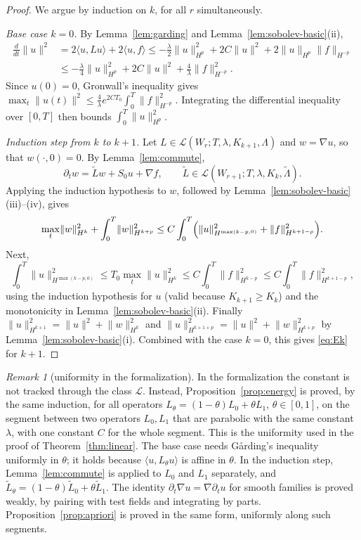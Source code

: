 \documentclass[11pt,reqno]{amsart}
\theoremstyle{definition}
\theoremstyle{remark}
\newtheorem{remark}[theorem]{Remark}
\newcommand{\Lcl}{\mathcal{L}}
\newcommand{\ip}[2]{\langle #1,#2\rangle}
\newcommand{\norm}[1]{\lVert #1\rVert}
\newcommand{\uses}[1]{}
\numberwithin{equation}{section}
\begin{document}
\begin{proof}
\uses{lem:garding, lem:commute, lem:sobolev-basic, fact:gronwall}
We argue by induction on $k$, for all $r$ simultaneously.

\emph{Base case $k=0$.} By Lemma~\ref{lem:garding} and
Lemma~\ref{lem:sobolev-basic}(ii),
\begin{align*}
\frac{d}{dt}\norm u^2&=2\ip u{Lu}+2\ip uf
\le-\frac\lambda2\norm u_{H^p}^2+2C\norm u^2+2\norm u_{H^p}\norm f_{H^{-p}}\\
&\le-\frac\lambda4\norm u_{H^p}^2+2C\norm u^2+\frac4\lambda\norm f_{H^{-p}}^2 .
\end{align*}
Since $u(0)=0$, Gronwall's inequality gives
$\max_t\norm{u(t)}^2\le\frac4\lambda e^{2CT_0}\int_0^T\norm f_{H^{-p}}^2$. Integrating the differential
inequality over $[0,T]$ then bounds $\int_0^T\norm u_{H^p}^2$.

\emph{Induction step from $k$ to $k+1$.} Let $L\in\Lcl(W_r;T,\lambda,K_{k+1},\Lambda)$ and $w=\nabla u$,
so that $w(\cdot,0)=0$. By Lemma~\ref{lem:commute},
\[
  \partial_tw=\tilde Lw+S_0u+\nabla f,\qquad\tilde L\in\Lcl(W_{r+1};T,\lambda,K_k,\tilde\Lambda).
\]
Applying the induction hypothesis to $w$, followed by Lemma~\ref{lem:sobolev-basic}(iii)--(iv), gives
\[
  \max_t\norm{w}_{H^k}^2+\int_0^T\norm w_{H^{k+p}}^2
  \le C\int_0^T\Bigl(\norm u^2_{H^{\max(k-p,0)}}+\norm f_{H^{k+1-p}}^2\Bigr).
\]
Next,
\[
  \int_0^T\norm u^2_{H^{\max(k-p,0)}}\le T_0\max_t\norm u_{H^k}^2
  \le C\int_0^T\norm f_{H^{k-p}}^2\le C\int_0^T\norm f^2_{H^{k+1-p}},
\]
using the induction hypothesis for $u$ (valid because $K_{k+1}\ge K_k$) and the monotonicity in
Lemma~\ref{lem:sobolev-basic}(ii). Finally
$\norm u_{H^{k+1}}^2=\norm u^2+\norm w_{H^k}^2$ and
$\norm u_{H^{k+1+p}}^2=\norm u^2+\norm w_{H^{k+p}}^2$ by Lemma~\ref{lem:sobolev-basic}(i). Combined
with the case $k=0$, this gives \eqref{eq:Ek} for $k+1$.
\end{proof}

\begin{remark}[uniformity in the formalization]
In the formalization the constant is not tracked through the class $\Lcl$. Instead,
Proposition~\ref{prop:energy} is proved, by the same induction, for all operators
$L_\theta=(1-\theta)L_0+\theta L_1$, $\theta\in[0,1]$, on the segment between two operators $L_0,L_1$ that
are parabolic with the same constant $\lambda$, with one constant $C$ for the whole segment. This is
the uniformity used in the proof of Theorem~\ref{thm:linear}. The base case needs G\aa rding's inequality
uniformly in $\theta$; it holds because $\ip u{L_\theta u}$ is affine in $\theta$. In the induction step,
Lemma~\ref{lem:commute} is applied to $L_0$ and $L_1$ separately, and $\tilde L_\theta=(1-\theta)\tilde L_0+\theta\tilde L_1$.
The identity $\partial_t\nabla u=\nabla\partial_tu$ for smooth families is proved weakly, by pairing with test
fields and integrating by parts. Proposition~\ref{prop:apriori} is proved in the same form,
uniformly along such segments.
\end{remark}
\end{document}
